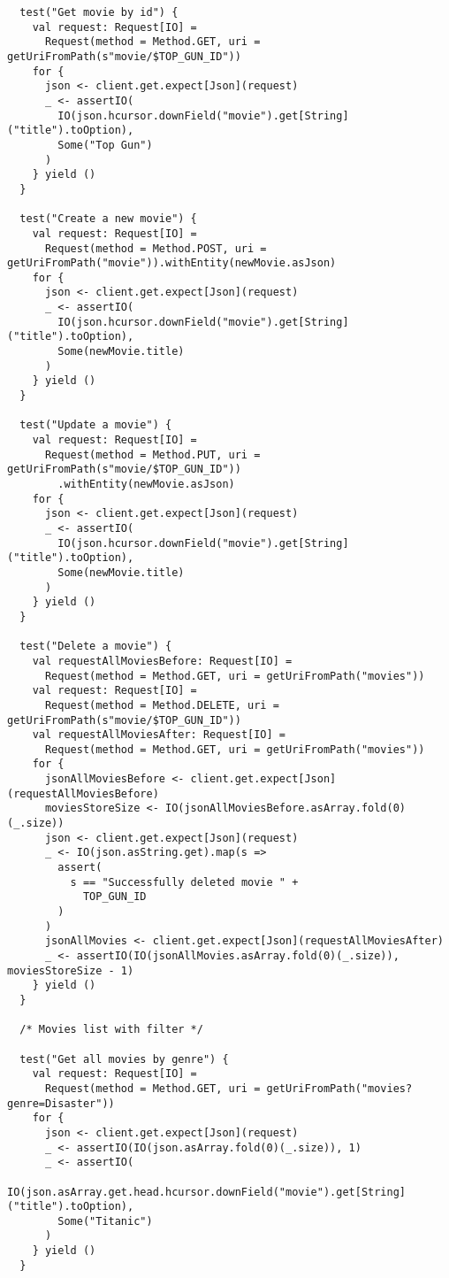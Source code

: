 \begin{verbatim}
  test("Get movie by id") {
    val request: Request[IO] =
      Request(method = Method.GET, uri = getUriFromPath(s"movie/$TOP_GUN_ID"))
    for {
      json <- client.get.expect[Json](request)
      _ <- assertIO(
        IO(json.hcursor.downField("movie").get[String]("title").toOption),
        Some("Top Gun")
      )
    } yield ()
  }

  test("Create a new movie") {
    val request: Request[IO] =
      Request(method = Method.POST, uri = getUriFromPath("movie")).withEntity(newMovie.asJson)
    for {
      json <- client.get.expect[Json](request)
      _ <- assertIO(
        IO(json.hcursor.downField("movie").get[String]("title").toOption),
        Some(newMovie.title)
      )
    } yield ()
  }

  test("Update a movie") {
    val request: Request[IO] =
      Request(method = Method.PUT, uri = getUriFromPath(s"movie/$TOP_GUN_ID"))
        .withEntity(newMovie.asJson)
    for {
      json <- client.get.expect[Json](request)
      _ <- assertIO(
        IO(json.hcursor.downField("movie").get[String]("title").toOption),
        Some(newMovie.title)
      )
    } yield ()
  }

  test("Delete a movie") {
    val requestAllMoviesBefore: Request[IO] =
      Request(method = Method.GET, uri = getUriFromPath("movies"))
    val request: Request[IO] =
      Request(method = Method.DELETE, uri = getUriFromPath(s"movie/$TOP_GUN_ID"))
    val requestAllMoviesAfter: Request[IO] =
      Request(method = Method.GET, uri = getUriFromPath("movies"))
    for {
      jsonAllMoviesBefore <- client.get.expect[Json](requestAllMoviesBefore)
      moviesStoreSize <- IO(jsonAllMoviesBefore.asArray.fold(0)(_.size))
      json <- client.get.expect[Json](request)
      _ <- IO(json.asString.get).map(s =>
        assert(
          s == "Successfully deleted movie " +
            TOP_GUN_ID
        )
      )
      jsonAllMovies <- client.get.expect[Json](requestAllMoviesAfter)
      _ <- assertIO(IO(jsonAllMovies.asArray.fold(0)(_.size)), moviesStoreSize - 1)
    } yield ()
  }

  /* Movies list with filter */

  test("Get all movies by genre") {
    val request: Request[IO] =
      Request(method = Method.GET, uri = getUriFromPath("movies?genre=Disaster"))
    for {
      json <- client.get.expect[Json](request)
      _ <- assertIO(IO(json.asArray.fold(0)(_.size)), 1)
      _ <- assertIO(
        IO(json.asArray.get.head.hcursor.downField("movie").get[String]("title").toOption),
        Some("Titanic")
      )
    } yield ()
  }


\end{verbatim}
